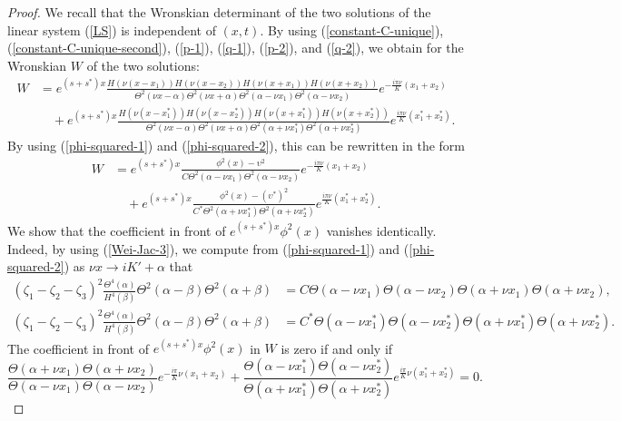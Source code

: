 \documentclass[12pt,reqno]{amsart}
\numberwithin{equation}{section}
\begin{document}
\begin{proof}
	We recall that the Wronskian determinant of the two solutions of the linear system (\ref{LS}) is independent of $(x,t)$. By using (\ref{constant-C-unique}), (\ref{constant-C-unique-second}), (\ref{p-1}), (\ref{q-1}), (\ref{p-2}), and (\ref{q-2}), we obtain for the Wronskian $W$ of the two solutions:
\begin{align*}
W &= e^{(s+s^*)x} \frac{H(\nu (x-x_1)) H(\nu (x-x_2)) H(\nu (x+x_1)) 
	H(\nu (x+x_2))}{\Theta^2(\nu x - \alpha) \Theta^2(\nu x + \alpha) 
\Theta^2(\alpha - \nu x_1) \Theta^2(\alpha - \nu x_2)} e^{-\frac{i \pi \nu }{K} (x_1 + x_2)} \\
& \quad + e^{(s+s^*)x} \frac{H(\nu (x - x_1^*)) H(\nu (x - x_2^*)) H(\nu (x + x_1^*)) H(\nu (x + x_2^*))}{\Theta^2(\nu x - \alpha) \Theta^2(\nu x + \alpha) 
	\Theta^2(\alpha + \nu x_1^*) \Theta^2(\alpha + \nu x_2^*)} e^{\frac{i \pi \nu}{K} (x_1^* + x_2^*)}.
\end{align*}
By using (\ref{phi-squared-1}) and (\ref{phi-squared-2}), this can be rewritten in the form 
\begin{align*}
W &= e^{(s+s^*)x} \frac{\phi^2(x) - \upsilon^2}{C
	\Theta^2(\alpha - \nu x_1) \Theta^2(\alpha - \nu x_2)} e^{-\frac{i \pi \nu}{K} (x_1 + x_2)} \\
& \quad + e^{(s+s^*)x} \frac{\phi^2(x) - (\upsilon^*)^2}{C^*
	\Theta^2(\alpha + \nu x_1^*) \Theta^2(\alpha + \nu x_2^*)} e^{\frac{i \pi \nu}{K} (x_1^* + x_2^*)}.
\end{align*}
We show that the coefficient in front of $e^{(s+s^*)x} \phi^2(x)$ vanishes identically. Indeed, by using (\ref{Wei-Jac-3}), we compute from (\ref{phi-squared-1}) and (\ref{phi-squared-2}) as $\nu x \to iK' + \alpha$ that 
\begin{align*}
(\zeta_1 - \zeta_2 - \zeta_3)^2 \frac{\Theta^4(\alpha)}{H^4(\beta)} 
\Theta^2(\alpha - \beta) \Theta^2(\alpha + \beta) &= C \Theta(\alpha - \nu x_1) \Theta(\alpha - \nu x_2) \Theta(\alpha + \nu x_1) \Theta(\alpha + \nu x_2), \\
(\zeta_1 - \zeta_2 - \zeta_3)^2 \frac{\Theta^4(\alpha)}{H^4(\beta)} 
\Theta^2(\alpha - \beta) \Theta^2(\alpha + \beta) &= C^* \Theta(\alpha - \nu x_1^*) \Theta(\alpha - \nu x_2^*) \Theta(\alpha + \nu x_1^*) \Theta(\alpha + \nu x_2^*).
\end{align*}
The coefficient in front of $e^{(s+s^*)x} \phi^2(x)$ in $W$ is zero if and only if 
$$
\frac{\Theta(\alpha + \nu x_1) \Theta(\alpha + \nu x_2)}{\Theta(\alpha - \nu x_1) \Theta(\alpha - \nu x_2)} e^{-\frac{i \pi}{K} \nu (x_1 + x_2)} + \frac{\Theta(\alpha - \nu x_1^*) \Theta(\alpha - \nu x_2^*)}{\Theta(\alpha + \nu x_1^*) \Theta(\alpha + \nu x_2^*)} e^{\frac{i \pi}{K} \nu (x_1^* + x_2^*)} = 0.
$$
\end{proof}
\end{document}
